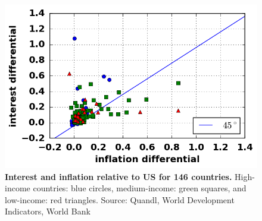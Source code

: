 \begin{figure}[h]
\caption{\label{fig:inflation_interest_differentials_open} \textbf{Interest and inflation relative to US for 146 countries.} High-income countries: blue circles, medium-income: green squares, and low-income: red triangles. {\tiny Source: Quandl, World Development Indicators, World Bank}}
\hspace*{-.5cm}\includegraphics[height = 7.cm]{./png/fig_inflation_interest_differentials_open.png}
\end{figure}